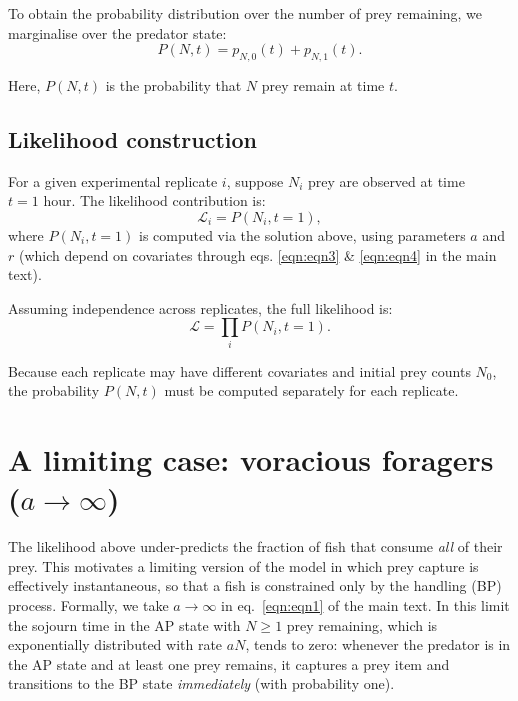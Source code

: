 To obtain the probability distribution over the number of prey remaining, we marginalise over the predator state:
\[
P(N,t) = p_{N,0}(t) + p_{N,1}(t).
\]

Here, $P(N,t)$ is the probability that $N$ prey remain at time $t$.

\subsection*{Likelihood construction}

For a given experimental replicate $i$, suppose $N_i$ prey are observed at time $t=1 \text{ hour}$. The likelihood contribution is:
\[
\mathcal{L}_i = P(N_i, t=1),
\]
where $P(N_i,t=1)$ is computed via the solution above, using parameters $a$ and $r$ (which depend on covariates through eqs. \eqref{eqn:eqn3} \& \eqref{eqn:eqn4} in the main text).

Assuming independence across replicates, the full likelihood is:
\[
\mathcal{L} = \prod_i P(N_i, t=1).
\]

Because each replicate may have different covariates and initial prey counts $N_0$, the probability $P(N,t)$ must be computed separately for each replicate.

\section{A limiting case: voracious foragers ($a \to \infty$)}
\label{app:voracious}

The likelihood above under-predicts the fraction of fish that consume \emph{all} of their prey. This motivates a limiting version of the model in which prey capture is effectively instantaneous, so that a fish is constrained only by the handling (BP) process. Formally, we take $a \to \infty$ in eq.\ \eqref{eqn:eqn1} of the main text. In this limit the sojourn time in the AP state with $N \geq 1$ prey remaining, which is exponentially distributed with rate $aN$, tends to zero: whenever the predator is in the AP state and at least one prey remains, it captures a prey item and transitions to the BP state \emph{immediately} (with probability one).

